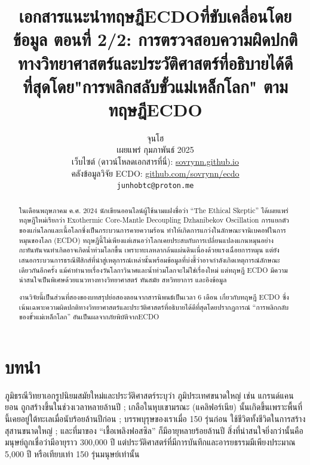\documentclass[10pt,twocolumn,letterpaper]{article}
\begin{document}
\title{เอกสารแนะนำทฤษฎีECDOที่ขับเคลื่อนโดยข้อมูล ตอนที่ 2/2: การตรวจสอบความผิดปกติทางวิทยาศาสตร์และประวัติศาสตร์ที่อธิบายได้ดีที่สุดโดย"การพลิกสลับขั้วแม่เหล็กโลก" ตามทฤษฎีECDO}

\author{จุนโฮ\\
เผยแพร่ กุมภาพันธ์ 2025\\
เว็บไซต์ (ดาวน์โหลดเอกสารที่นี่): \href{https://sovrynn.github.io}{sovrynn.github.io}\\
คลังข้อมูลวิจัย ECDO: \href{https://github.com/sovrynn/ecdo}{github.com/sovrynn/ecdo}\\
{\tt\small junhobtc@proton.me}
}

\maketitle

\begin{abstract}
ในเดือนพฤษภาคม ค.ศ. 2024 นักเขียนออนไลน์ผู้ใช้นามแฝงชื่อว่า “The Ethical Skeptic” \cite{0} ได้เผยแพร่ทฤษฎีใหม่เรียกว่า Exothermic Core-Mantle Decoupling Dzhanibekov Oscillation การแยกตัวของแก่นโลกและเนื้อโลกซึ่งเป็นกระบวนการคายความร้อน ทำให้เกิดการแกว่งในลักษณะจานิเบคอฟในการหมุนของโลก (ECDO) \cite{1} ทฤษฎีนี้ไม่เพียงแต่เสนอว่าโลกเคยประสบกับการเปลี่ยนแปลงแกนหมุนอย่างกะทันหันจนทำเกิดอาจเกิดน้ำท่วมโลกขึ้น เพราะทะเลหลากล้นแผ่นดินเนื่องด้วยแรงเฉื่อยการหมุน แต่ยังเสนอกระบวนการธรณีฟิสิกส์ที่นำสู่เหตุการณ์เหล่านั้นพร้อมข้อมูลที่บ่งชี้ว่าอาจกำลังเกิดเหตุการณ์ลักษณะเดียวกันอีกครั้ง แม้คำทำนายเรื่องวันโลกาวินาศและน้ำท่วมโลกจะไม่ใช่เรื่องใหม่ แต่ทฤษฎี ECDO มีความน่าสนใจเป็นพิเศษด้วยแนวทางทางวิทยาศาสตร์ ทันสมัย สหวิทยาการ และอิงข้อมูล

งานวิจัยนี้เป็นส่วนที่สองของบทสรุปย่อสองตอนจากสารนิพนธ์เป็นเวลา 6 เดือน \cite{2,20} เกี่ยวกับทฤษฎี ECDO ซึ่งเน้นเฉพาะความผิดปกติทางวิทยาศาสตร์และประวัติศาสตร์ที่อธิบายได้ดีที่สุดโดยปรากฏการณ์ “การพลิกกลับของขั้วแม่เหล็กโลก” อันเป็นผลจากภัยพิบัติจากECDO
\end{abstract}

\section{บทนำ}

ภูมิธรณีวิทยาเอกรูปนิยมสมัยใหม่และประวัติศาสตร์ระบุว่า ภูมิประเทศขนาดใหญ่ เช่น แกรนด์แคนยอน ถูกสร้างขึ้นในช่วงเวลาหลายล้านปี \cite{143}; เกลือในหุบเขามรณะ (แคลิฟอร์เนีย) นั้นเกิดขึ้นเพราะพื้นที่นี้เคยอยู่ใต้ทะเลเมื่อนับร้อยล้านปีก่อน \cite{144}; บรรพบุรุษของเราเมื่อ 150 รุ่นก่อน ใช้ชีวิตทั้งชีวิตในการสร้างสุสานขนาดใหญ่ \cite{29,70}; และที่มาของ “เชื้อเพลิงฟอสซิล” ก็มีอายุหลายร้อยล้านปี \cite{104} สิ่งที่น่าสนใจยิ่งกว่านั้นคือมนุษย์ถูกเชื่อว่ามีอายุราว 300,000 ปี \cite{145} แต่ประวัติศาสตร์ที่มีการบันทึกและอารยธรรมมีเพียงประมาณ 5,000 ปี หรือเทียบเท่า 150 รุ่นมนุษย์เท่านั้น
\end{document}
